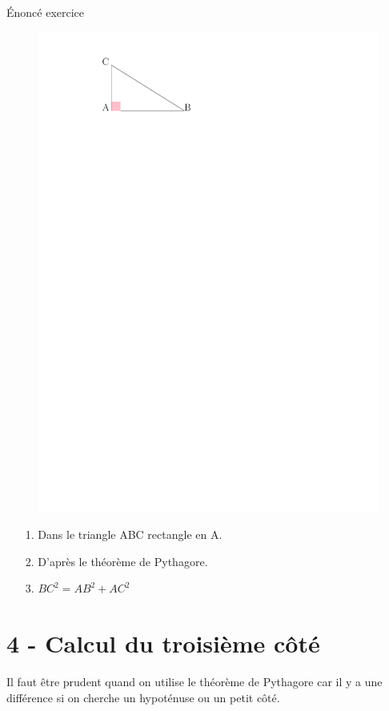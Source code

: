 \documentclass[12pt]{article}
\begin{document}
\begin{Theorem}{Énoncé exercice}\\

	\begin{figure}[H]
		\centering
		\includegraphics[width=0.3\linewidth]{4x1-pythagore/sources/thm-exo.pdf}
	\end{figure}
	
	\begin{enumerate}
		\item[1.] Dans le triangle ABC rectangle en A.
		\item[2.] D'après le théorème de Pythagore.
		\item[3.] $BC^2 = AB^2 + AC^2$
	\end{enumerate}
\end{Theorem}

\newpage
\section*{4 - Calcul du troisième côté}

Il faut être prudent quand on utilise le théorème de Pythagore car il y a une différence si on cherche un hypoténuse ou un petit côté.
\end{document}
